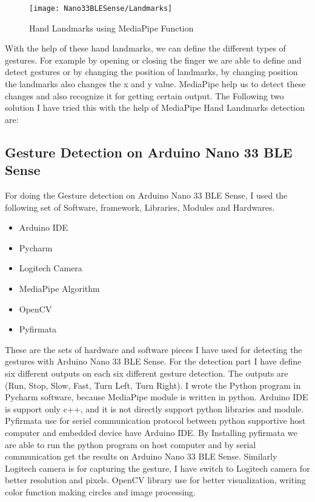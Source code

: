 \begin{figure}[h]
	\centering
	\texttt{[image: Nano33BLESense/Landmarks]}
	\caption{Hand Landmarks using MediaPipe Function}
	\label{Hand Landmarks using MediaPipe Function}
\end{figure}

With the help of these hand landmarks, we can define the different types of gestures. For example by opening or closing the finger we are able to define and detect gestures or by changing the position of landmarks, by changing position the landmarks also changes the x and y value. MediaPipe help us to detect these changes and also recognize it for getting certain output. The Following two solution I have tried this with the help of MediaPipe Hand Landmarks detection are:

\subsection{Gesture Detection on Arduino Nano 33 BLE Sense}

For doing the Gesture detection on Arduino Nano 33 BLE Sense, I used the following set of Software, framework, Libraries, Modules and Hardwares.

\begin{itemize}
	\item Arduino IDE
	\item Pycharm
	\item Logitech Camera
	\item MediaPipe Algorithm
	\item OpenCV
	\item Pyfirmata
\end{itemize}  

These are the sets of hardware and software pieces I have used for detecting the gestures with Arduino Nano 33 BLE Sense. For the detection part I have define six different outputs on each six different gesture detection. The outputs are (Run, Stop, Slow, Fast, Turn Left, Turn Right). I wrote the Python program in Pycharm software, because MediaPipe module is written in python. Arduino IDE is support only c++, and it is not directly support python libraries and module. Pyfirmata use for seriel communication protocol between python supportive host computer and embedded device have Arduino IDE. By Installing pyfirmata we are able to run the python program on host computer and by serial communication get the results on Arduino Nano 33 BLE Sense. 
Similarly Logitech camera is for capturing the gesture, I have switch to Logitech camera for better resolution and pixels. OpenCV library use for better visualization, writing color function making circles and image processing.

